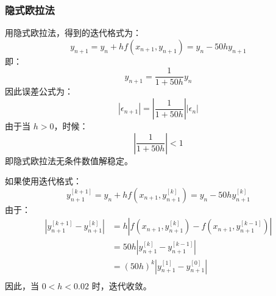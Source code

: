 \documentclass{article}
\begin{document}
\subsubsection{隐式欧拉法}
用隐式欧拉法，得到的迭代格式为：
\begin{equation*}
    y_{n + 1} = y_{n} + hf(x_{n+1}, y_{n+1}) = y_{n} - 50hy_{n+1}
\end{equation*}
即：
\begin{equation*}
    y_{n + 1} = \frac{1}{1 + 50h} y_{n}
\end{equation*}
因此误差公式为：
\begin{equation*}
    |\epsilon_{n + 1}| = \left|\frac{1}{1 + 50h}\right||\epsilon_{n}|
\end{equation*}
由于当 $h > 0$，时候：
\begin{equation*}
    \left|\frac{1}{1 + 50h}\right| < 1
\end{equation*}
即隐式欧拉法无条件数值解稳定。

如果使用迭代格式：
\begin{equation*}
    y_{n + 1}^{[k + 1]} = y_{n} + hf(x_{n + 1}, y_{n + 1}^{[k]}) = y_{n} - 50hy_{n + 1}^{[k]}
\end{equation*}
由于：
\begin{equation*}
    \begin{aligned}
        \left|y_{n + 1}^{[k + 1]} - y_{n + 1}^{[k]}\right|&=h\left|f(x_{n + 1}, y_{n + 1}^{[k]}) - f(x_{n + 1}, y_{n + 1}^{[k - 1]})\right|\\
        &=50h\left|y_{n + 1}^{[k]} - y_{n + 1}^{[k - 1]}\right|\\
        &=(50h)^k\left|y_{n + 1}^{[1]} - y_{n + 1}^{[0]}\right|\\
    \end{aligned}
\end{equation*}
因此，当 $0<h<0.02$ 时，迭代收敛。
\end{document}
